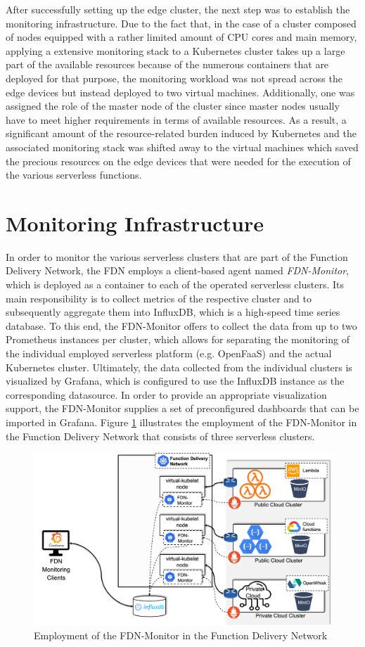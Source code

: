 After successfully setting up the edge cluster, the next step was to establish the monitoring infrastructure. Due to the fact that, in the case of a cluster composed of nodes equipped with a rather limited amount of CPU cores and main memory, applying a extensive monitoring stack to a Kubernetes cluster takes up a large part of the available resources because of the numerous containers that are deployed for that purpose, the monitoring workload was not spread across the edge devices but instead deployed to two virtual machines. Additionally, one was assigned the role of the master node of the cluster since master nodes usually have to meet higher requirements in terms of available resources. As a result, a significant amount of the resource-related burden induced by Kubernetes and the associated monitoring stack was shifted away to the virtual machines which saved the precious resources on the edge devices that were needed for the execution of the various serverless functions.

\section{Monitoring Infrastructure}
In order to monitor the various serverless clusters that are part of the Function Delivery Network, the FDN employs a client-based agent named \textit{FDN-Monitor}, which is deployed as a container to each of the operated serverless clusters. Its main responsibility is to collect metrics of the respective cluster and to subsequently aggregate them into InfluxDB, which is a high-speed time series database. To this end, the FDN-Monitor offers to collect the data from up to two Prometheus instances per cluster, which allows for separating the monitoring of the individual employed serverless platform (e.g. OpenFaaS) and the actual Kubernetes cluster. Ultimately, the data collected from the individual clusters is visualized by Grafana, which is configured to use the InfluxDB instance as the corresponding datasource. In order to provide an appropriate visualization support, the FDN-Monitor supplies a set of preconfigured dashboards that can be imported in Grafana. Figure \ref{fig:fdn-monitor} illustrates the employment of the FDN-Monitor in the Function Delivery Network that consists of three serverless clusters.

\begin{figure}[h]
    \centering
    \includegraphics[width=1\textwidth]{./figures/FDN-Monitor}
    \caption{Employment of the FDN-Monitor in the Function Delivery Network}
    \label{fig:fdn-monitor}
\end{figure}